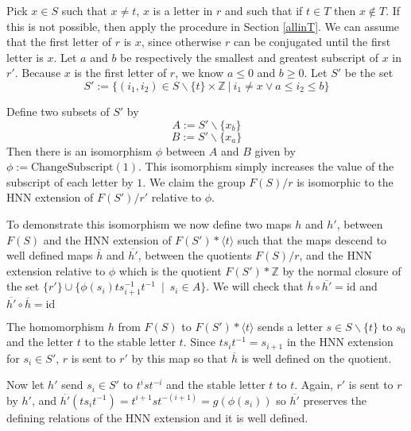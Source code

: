 \documentclass[12pt]{article} %
\theoremstyle{definition}
\theoremstyle{definition}
\theoremstyle{definition}
\theoremstyle{definition}
\theoremstyle{definition}
\theoremstyle{definition}
\begin{document}
Pick $x \in S$ such that $x \ne t$,
  $x$ is a letter in $r$ and such that if $t \in T$ then $x \notin T$.
  If this is not possible, then apply the procedure in Section \ref{allinT}.
We can assume that the first letter of $r$ is
$x$, since otherwise $r$ can be conjugated until the first letter is $x$.
Let $a$ and $b$ be respectively the
smallest and greatest subscript of $x$ in $r'$. Because $x$ is the first
letter of $r$, we know $a \le 0$ and $b \ge 0$. Let $S'$ be the set
\begin{equation}
S' := \{(i_1, i_2) \in S \backslash \{t\} \times \mathbb{Z} \
| \ i_1 \ne x \vee a \le i_2 \le b \}
\end{equation}

Define two subsets of $S'$ by
\begin{equation}
  A := S' \backslash \{x_b\}
\end{equation}
\begin{equation}
  B := S' \backslash \{x_a\}
\end{equation}
Then there is an isomorphism $\phi$ between $A$ and $B$ given by
$\phi := \text{ChangeSubscript}(1)$. This isomorphism simply
increases the value of the subscript of each letter by $1$.
We claim the group $F(S) / r$ is isomorphic to the HNN extension of
$F(S') / r'$ relative to $\phi$.

To demonstrate this isomorphism we now define two maps $h$ and $h'$,
between $F(S)$ and the HNN extension of $F(S') \ast \langle t \rangle$ such that
the maps descend to well defined maps $\overline{h}$ and $\overline{h'}$, between the quotients
$F(S) / r$, and the HNN extension relative to $\phi$ which is the
quotient $F(S') \ast \mathbb{Z}$ by the normal closure of the set
$\{r'\} \cup \{\phi(s_i)ts_{i+1}^{-1}t^{-1} \ \mid \ s_i \in A\}$.
We will check that $\overline{h} \circ \overline{h'} = \text{id}$ and
$\overline{h'} \circ \overline{h} = \text{id}$

The homomorphism $h$ from $F(S)$ to $F(S') \ast \langle t \rangle$ sends a letter
$s \in S \backslash \{t\}$ to $s_0$ and
the letter $t$ to the stable letter $t$.
Since $t s_i t^{-1} = s_{i+1}$ in
the HNN extension for $s_i \in S'$,
$r$ is sent to $r'$ by this map so that $\overline{h}$ is well defined
on the quotient.

Now let $h'$ send $s_i \in S'$ to $t^{i} s t^{-i}$ and the stable letter $t$ to $t$.
Again, $r'$ is sent to $r$ by $h'$, and $\overline{h'} (t s_i t^{-1}) = t^{i+1} s t^{-(i+1)} =
g (\phi (s_i))$ so $\overline{h'}$ preserves the defining relations of the HNN extension and it
is well defined.
\end{document}
